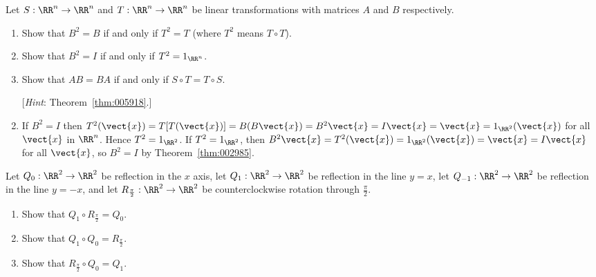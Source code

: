 \begin{multicols}{2}
\begin{ex}
Let $S : \RR^n \to \RR^n$ and $T : \RR^n \to \RR^n$ be linear transformations with matrices $A$ and $B$ respectively.

\begin{enumerate}[label={\alph*.}]
\item Show that $B^{2} = B$ if and only if $T^{2} = T$ (where $T^{2}$ means $T \circ T$).

\item Show that $B^{2} = I$ if and only if $T^2 = 1_{\RR^n}$.

\item Show that $AB = BA$ if and only if $S \circ T = T \circ S$.

\item[] [\textit{Hint}: Theorem~\ref{thm:005918}.]
\end{enumerate}


\begin{sol}
\begin{enumerate}[label={\alph*.}]
\setcounter{enumi}{1}
\item  If $B^{2} = I$ then $T^{2}(\vect{x}) = T[T(\vect{x})] = B(B\vect{x}) = B^{2}\vect{x} = I\vect{x} = \vect{x} = 1_{\RR^2}(\vect{x})$ for all $\vect{x}$ in $\RR^n$. Hence $T^{2} = 1_{\RR^2}$. If $T^{2} = 1_{\RR^2}$, then $B^{2}\vect{x} = T^{2}(\vect{x}) = 1_{\RR^2}(\vect{x}) = \vect{x} = I\vect{x}$ for all $\vect{x}$, so $B^{2} = I$ by Theorem~\ref{thm:002985}.

\end{enumerate}
\end{sol}
\end{ex}

\begin{ex}
Let $Q_{0} : \RR^2 \to \RR^2$ be reflection in the $x$ axis, let $Q_{1} : \RR^2 \to \RR^2$ be reflection in the line $y = x$, let $Q_{-1} : \RR^2 \to \RR^2$ be reflection in the line $y = -x$, and let $R_{\frac{\pi}{2}} : \RR^2 \to \RR^2$ be counterclockwise rotation through $\frac{\pi}{2}$.

\begin{enumerate}[label={\alph*.}]
\item Show that $Q_{1} \circ R_{\frac{\pi}{2}} = Q_{0}$.

\item Show that $Q_{1} \circ Q_{0} = R_{\frac{\pi}{2}}$.

\item Show that $R_{\frac{\pi}{2}} \circ Q_{0} = Q_{1}$.


\end{enumerate}
\end{ex}
\end{multicols}
